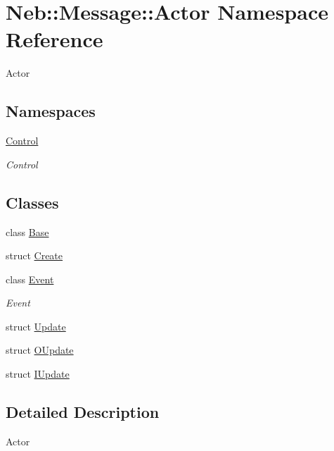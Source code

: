 \hypertarget{namespaceNeb_1_1Message_1_1Actor}{\section{Neb\-:\-:Message\-:\-:Actor Namespace Reference}
\label{namespaceNeb_1_1Message_1_1Actor}
}


Actor  


\subsection*{Namespaces}
\begin{DoxyCompactItemize}
\item 
\hyperlink{namespaceNeb_1_1Message_1_1Actor_1_1Control}{Control}
\begin{DoxyCompactList}\small\item\em Control \end{DoxyCompactList}\end{DoxyCompactItemize}
\subsection*{Classes}
\begin{DoxyCompactItemize}
\item 
class \hyperlink{classNeb_1_1Message_1_1Actor_1_1Base}{Base}
\item 
struct \hyperlink{structNeb_1_1Message_1_1Actor_1_1Create}{Create}
\item 
class \hyperlink{classNeb_1_1Message_1_1Actor_1_1Event}{Event}
\begin{DoxyCompactList}\small\item\em Event \end{DoxyCompactList}\item 
struct \hyperlink{structNeb_1_1Message_1_1Actor_1_1Update}{Update}
\item 
struct \hyperlink{structNeb_1_1Message_1_1Actor_1_1OUpdate}{O\-Update}
\item 
struct \hyperlink{structNeb_1_1Message_1_1Actor_1_1IUpdate}{I\-Update}
\end{DoxyCompactItemize}


\subsection{Detailed Description}
Actor 
